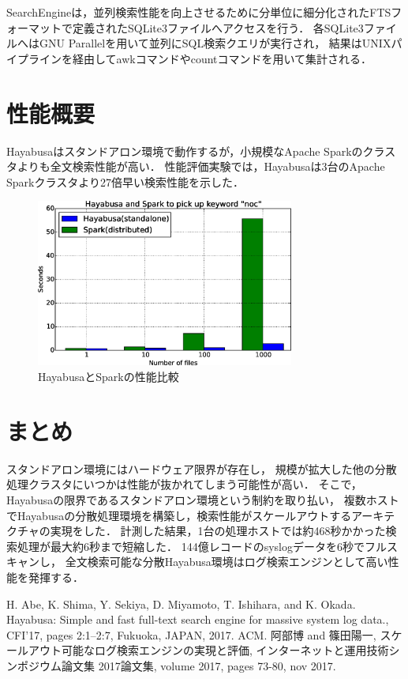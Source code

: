 \documentclass[twocolumn,10pt]{jarticle}
\begin{document}
SearchEngineは，並列検索性能を向上させるために分単位に細分化されたFTSフォーマットで定義されたSQLite3ファイルへアクセスを行う．
各SQLite3ファイルへはGNU Parallelを用いて並列にSQL検索クエリが実行され，
結果はUNIXパイプラインを経由してawkコマンドやcountコマンドを用いて集計される．


\section{性能概要}
Hayabusaはスタンドアロン環境で動作するが，小規模なApache Sparkのクラスタよりも全文検索性能が高い．
性能評価実験では，Hayabusaは3台のApache Sparkクラスタより27倍早い検索性能を示した．
\begin{figure}[h]
\centering
\includegraphics[width=85mm]{./pictures/spark-sqlite-dist2.eps}
\caption{HayabusaとSparkの性能比較}
\label{fig:hayabusa-spark}
\end{figure}


\section{まとめ}
スタンドアロン環境にはハードウェア限界が存在し，
規模が拡大した他の分散処理クラスタにいつかは性能が抜かれてしまう可能性が高い．
そこで，Hayabusaの限界であるスタンドアロン環境という制約を取り払い，
複数ホストでHayabusaの分散処理環境を構築し，検索性能がスケールアウトするアーキテクチャの実現をした\cite{d-hayabusa}．
計測した結果，1台の処理ホストでは約468秒かかった検索処理が最大約6秒まで短縮した．
144億レコードのsyslogデータを6秒でフルスキャンし，
全文検索可能な分散Hayabusa環境はログ検索エンジンとして高い性能を発揮する．



\begin{thebibliography}{9}
   H. Abe, K. Shima, Y. Sekiya, D. Miyamoto, T. Ishihara, and K. Okada. Hayabusa: Simple and fast full-text search engine for massive system log data., CFI’17, pages 2:1–2:7, Fukuoka, JAPAN, 2017. ACM.
   阿部博 and 篠田陽一, スケールアウト可能なログ検索エンジンの実現と評価, インターネットと運用技術シンポジウム論文集 2017論文集, volume 2017, pages 73-80, nov 2017.

\end{thebibliography}
\end{document}
